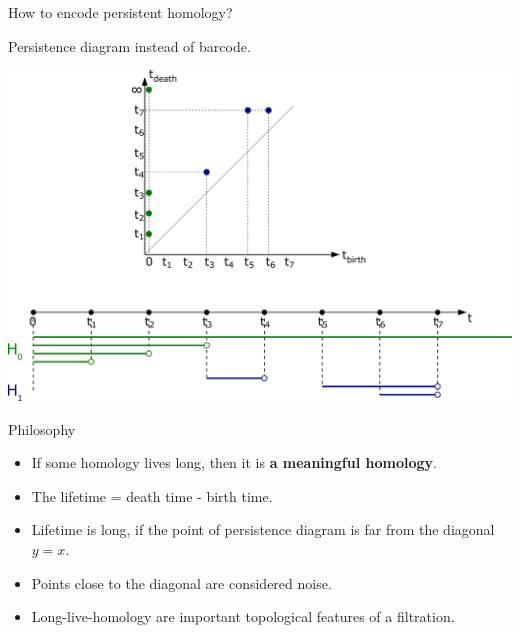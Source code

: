 \documentclass[10pt,xcolor={usenames}]{beamer}
\begin{document}
\begin{frame}{How to encode persistent homology?}

Persistence diagram instead of barcode.

\begin{center}
\includegraphics[scale=0.15]{pictures/persdiagram.pdf}
\end{center}

\end{frame}

\begin{frame}{Philosophy}

\begin{itemize}
  \item If some homology lives long, then it is \textbf{a meaningful homology}.
  \item The lifetime = death time - birth time.
  \item Lifetime is long, if the point of persistence diagram is far from the diagonal $y=x$.
  \item Points close to the diagonal are considered noise.
  \item Long-live-homology are important topological features of a filtration.
\end{itemize}

\end{frame}
\end{document}
